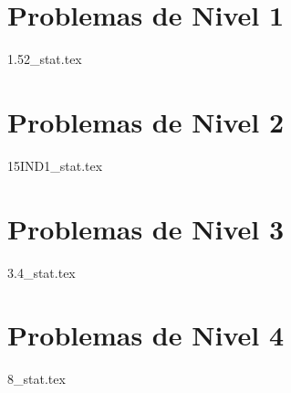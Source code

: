 \section{Problemas de Nivel 1}
{1.52_stat.tex} %

\section{Problemas de Nivel 2}
{15IND1_stat.tex} %

\section{Problemas de Nivel 3}
{3.4_stat.tex} %

\section{Problemas de Nivel 4}
{8_stat.tex} %